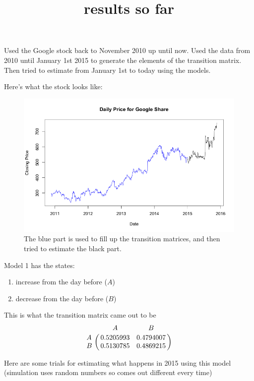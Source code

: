 \documentclass[12pt]{article}
\title{results so far}
\begin{document}
\maketitle

Used the Google stock back to November 2010 up until now. Used the data from 2010 until January 1st 2015 to generate the elements of the transition matrix. Then tried to estimate from January 1st to today using the models.

Here's what the stock looks like:

\begin{figure}[hb]
\caption{The blue part is used to fill up the transition matrices, and then tried to estimate the black part.}
\centering
\includegraphics[width=5.5in]{general_trend.png}
\end{figure}

\newpage
Model 1 has the states:
\begin{enumerate}
\item increase from the day before ($A$)
\item decrease from the day before ($B$)
\end{enumerate}
This is what the transition matrix came out to be
$$
\bordermatrix{~ & A & B \cr
                  A & 0.5205993 & 0.4794007 \cr
                  B & 0.5130785 & 0.4869215 \cr}
$$

Here are some trials for estimating what happens in 2015 using this model (simulation uses random numbers so comes out different every time)
\end{document}
